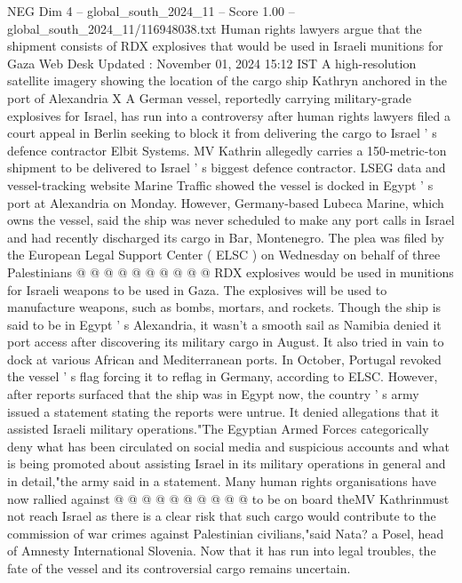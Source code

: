 \begin{textsample}{NEG Dim 4 – global\_south\_2024\_11 – Score 1.00 – global\_south\_2024\_11/116948038.txt}  \label{ex:f4_neg_202}
Human rights lawyers argue that the shipment consists of RDX explosives that would be used in Israeli munitions for Gaza Web Desk Updated : November 01, 2024 15:12 IST A high-resolution satellite imagery showing the location of the cargo ship Kathryn anchored in the port of Alexandria X A German vessel, reportedly carrying military-grade explosives for Israel, has run into a controversy after human rights lawyers filed a court appeal in Berlin seeking to block it from delivering the cargo to Israel ' s defence contractor Elbit Systems.
MV Kathrin allegedly carries a 150-metric-ton shipment to be delivered to Israel ' s biggest defence contractor.
LSEG data and vessel-tracking website Marine Traffic showed the vessel is docked in Egypt ' s port at Alexandria on Monday.
However, Germany-based Lubeca Marine, which owns the vessel, said the ship was never scheduled to make any port calls in Israel and had recently discharged its cargo in Bar, Montenegro.
The plea was filed by the European Legal Support Center ( ELSC ) on Wednesday on behalf of three Palestinians @ @ @ @ @ @ @ @ @ @ RDX explosives would be used in munitions for Israeli weapons to be used in Gaza.
The explosives will be used to manufacture weapons, such as bombs, mortars, and rockets.
Though the ship is said to be in Egypt ' s Alexandria, it wasn't a smooth sail as Namibia denied it port access after discovering its military cargo in August.
It also tried in vain to dock at various African and Mediterranean ports.
In October, Portugal revoked the vessel ' s flag forcing it to reflag in Germany, according to ELSC.
However, after reports surfaced that the ship was in Egypt now, the country ' s army issued a statement stating the reports were untrue.
It denied allegations that it assisted Israeli military operations."The Egyptian Armed Forces categorically deny what has been circulated on social media and suspicious accounts and what is being promoted about assisting Israel in its military operations in general and in detail,"the army said in a statement.
Many human rights organisations have now rallied against @ @ @ @ @ @ @ @ @ @ to be on board theMV Kathrinmust not reach Israel as there is a clear risk that such cargo would contribute to the commission of war crimes against Palestinian civilians,"said Nata? a Posel, head of Amnesty International Slovenia.
Now that it has run into legal troubles, the fate of the vessel and its controversial cargo remains uncertain.

\end{textsample}

